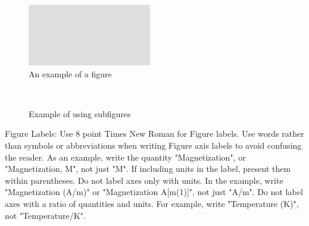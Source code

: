 \documentclass[a4paper,conference]{IEEEtran}
\begin{document}
\begin{figure}[!b]
\center
\includegraphics{fig1.png}
\caption{An example of a figure}
\label{figure_example}
\end{figure}

\begin{figure}[b!]
\center
{}\hspace{0.5em}
\\
\vspace{0.5em}
\hspace{0.5em}
\caption{Example of using subfigures}
\label{subfigure_example}
\end{figure}

Figure Labels: Use 8 point Times New Roman for Figure labels. Use words rather than symbols or abbreviations when writing Figure axis labels to avoid confusing the reader. As an example, write the quantity "Magnetization", or "Magnetization, M", not just "M". If including units in the label, present them within parentheses. Do not label axes only with units. In the example, write "Magnetization (A/m)" or "Magnetization {A[m(1)]}", not just "A/m". Do not label axes with a ratio of quantities and units. For example, write "Temperature (K)", not "Temperature/K".
\end{document}
